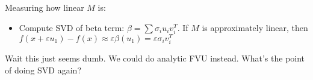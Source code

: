 \documentclass{article}
\theoremstyle{plain}
\theoremstyle{definition}
\theoremstyle{remark}
\begin{document}
Measuring how linear $M$ is:
\begin{itemize}
\item Compute SVD of beta term: $\beta = \sum \sigma_i u_i v_i^T$. If $M$ is approximately linear, then $f(x+\varepsilon u_1)-f(x) \approx \varepsilon\beta(u_1) = \varepsilon \sigma_i v_i^T$
\end{itemize}
Wait this just seems dumb. We could do analytic FVU instead. What's the point of doing SVD again?


\iffalse
\newpage
\begin{figure}[h]
    \centering
    \texttt{[image: figures/mnist/beta\_viz.png]}
    \caption{Linear logit basis}
    \label{fig:label_name}
\end{figure}

\begin{figure}[h]
    \centering
    \texttt{[image: figures/mnist/svd\_viz.png]}
    \caption{Left singular vectors of linear term}
    \label{fig:label_name}
\end{figure}

\begin{figure}[h]
    \centering
    \texttt{[image: icml2024/figures/mnist/gamma7\_eigs\_viz.png]}
    \caption{Eigenvectors for predicting a '7'}
    \label{fig:label_name}
\end{figure}

\begin{figure}[h]
    \centering
    \texttt{[image: figures/mnist/adv\_acc.png]}
    \caption{Accuracy tradeoff for top singular components}
    \label{fig:label_name}
\end{figure}

\begin{figure}[h]
    \centering
    \texttt{[image: figures/mnist/logits.png]}
    \caption{Accuracy tradeoff for top singular components}
    \label{fig:label_name}
\end{figure}
\fi
\end{document}
